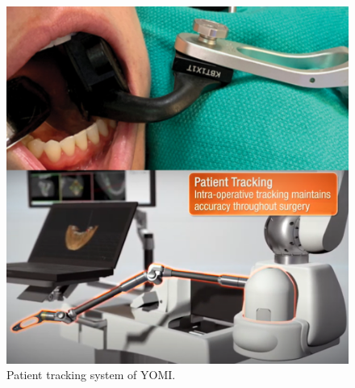 \par
\begin{figure}[htbp]
\begin{center}
\includegraphics[width=0.85\linewidth]{Images/patient_tracking.png}
\caption[Patient tracking system of YOMI]{
Patient tracking system of YOMI\cite{web3}\cite{intraoral_splint}. 
}\label{fig:patient_tracking}
\end{center}
\end{figure}
